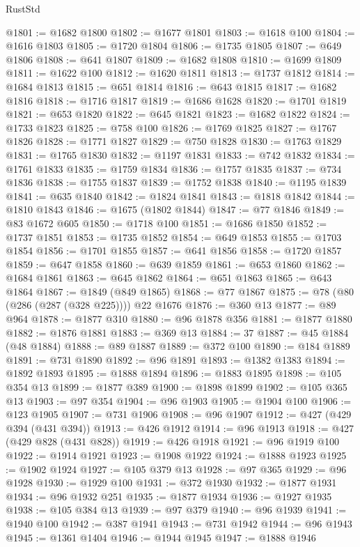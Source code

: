 \begin{lexlean}{RustStd}
\begin{coremodule}
@1801 := @1682 @1800
@1802 := @1677 @1801
@1803 := @1618 @100
@1804 := @1616 @1803
@1805 := @1720 @1804
@1806 := @1735 @1805
@1807 := @649 @1806
@1808 := @641 @1807
@1809 := @1682 @1808
@1810 := @1699 @1809
@1811 := @1622 @100
@1812 := @1620 @1811
@1813 := @1737 @1812
@1814 := @1684 @1813
@1815 := @651 @1814
@1816 := @643 @1815
@1817 := @1682 @1816
@1818 := @1716 @1817
@1819 := @1686 @1628
@1820 := @1701 @1819
@1821 := @653 @1820
@1822 := @645 @1821
@1823 := @1682 @1822
@1824 := @1733 @1823
@1825 := @758 @100
@1826 := @1769 @1825
@1827 := @1767 @1826
@1828 := @1771 @1827
@1829 := @750 @1828
@1830 := @1763 @1829
@1831 := @1765 @1830
@1832 := @1197 @1831
@1833 := @742 @1832
@1834 := @1761 @1833
@1835 := @1759 @1834
@1836 := @1757 @1835
@1837 := @734 @1836
@1838 := @1755 @1837
@1839 := @1752 @1838
@1840 := @1195 @1839
@1841 := @635 @1840
@1842 := @1824 @1841
@1843 := @1818 @1842
@1844 := @1810 @1843
@1846 := @1675 (@1802 @1844)
@1847 := @77 @1846
@1849 := @83 @1672 @605
@1850 := @1718 @100
@1851 := @1686 @1850
@1852 := @1737 @1851
@1853 := @1735 @1852
@1854 := @649 @1853
@1855 := @1703 @1854
@1856 := @1701 @1855
@1857 := @641 @1856
@1858 := @1720 @1857
@1859 := @647 @1858
@1860 := @639 @1859
@1861 := @653 @1860
@1862 := @1684 @1861
@1863 := @645 @1862
@1864 := @651 @1863
@1865 := @643 @1864
@1867 := @1849 (@849 @1865)
@1868 := @77 @1867
@1875 := @78 (@80 (@286 (@287 (@328 @225)))) @22 @1676
@1876 := @360 @13
@1877 := @89 @964
@1878 := @1877 @310
@1880 := @96 @1878 @356
@1881 := @1877 @1880
@1882 := @1876 @1881
@1883 := @369 @13
@1884 := 37
@1887 := @45 @1884 (@48 @1884)
@1888 := @89 @1887
@1889 := @372 @100
@1890 := @184 @1889
@1891 := @731 @1890
@1892 := @96 @1891
@1893 := @1382 @1383
@1894 := @1892 @1893
@1895 := @1888 @1894
@1896 := @1883 @1895
@1898 := @105 @354 @13
@1899 := @1877 @389
@1900 := @1898 @1899
@1902 := @105 @365 @13
@1903 := @97 @354
@1904 := @96 @1903
@1905 := @1904 @100
@1906 := @123 @1905
@1907 := @731 @1906
@1908 := @96 @1907
@1912 := @427 (@429 @394 (@431 @394))
@1913 := @426 @1912
@1914 := @96 @1913
@1918 := @427 (@429 @828 (@431 @828))
@1919 := @426 @1918
@1921 := @96 @1919 @100
@1922 := @1914 @1921
@1923 := @1908 @1922
@1924 := @1888 @1923
@1925 := @1902 @1924
@1927 := @105 @379 @13
@1928 := @97 @365
@1929 := @96 @1928
@1930 := @1929 @100
@1931 := @372 @1930
@1932 := @1877 @1931
@1934 := @96 @1932 @251
@1935 := @1877 @1934
@1936 := @1927 @1935
@1938 := @105 @384 @13
@1939 := @97 @379
@1940 := @96 @1939
@1941 := @1940 @100
@1942 := @387 @1941
@1943 := @731 @1942
@1944 := @96 @1943
@1945 := @1361 @1404
@1946 := @1944 @1945
@1947 := @1888 @1946

\end{coremodule}
\end{lexlean}
